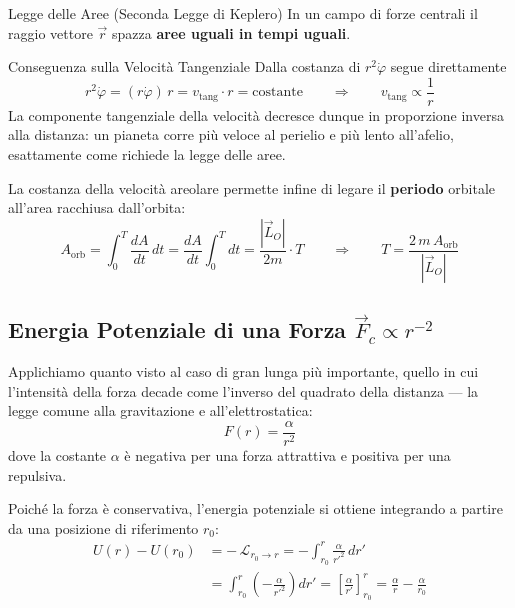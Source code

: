\begin{teorema}{Legge delle Aree (Seconda Legge di Keplero)}
In un campo di forze centrali il raggio vettore $\vec{r}$ spazza \textbf{aree uguali in tempi uguali}.
\end{teorema}

\begin{osservazione}{Conseguenza sulla Velocità Tangenziale}
Dalla costanza di $r^2\dot{\varphi}$ segue direttamente
\begin{equation}
    r^2 \dot{\varphi} = (r \dot{\varphi})\, r = v_{\text{tang}} \cdot r = \text{costante}
    \qquad \Longrightarrow \qquad
    v_{\text{tang}} \propto \frac{1}{r}
\end{equation}
La componente tangenziale della velocità decresce dunque in proporzione inversa alla distanza: un pianeta corre più veloce al perielio e più lento all'afelio, esattamente come richiede la legge delle aree.
\end{osservazione}

La costanza della velocità areolare permette infine di legare il \textbf{periodo} orbitale all'area racchiusa dall'orbita:
\begin{equation}
    A_{\text{orb}} = \int_0^T \frac{dA}{dt} \, dt
    = \frac{dA}{dt} \int_0^T dt
    = \frac{|\vec{L}_O|}{2m} \cdot T
    \qquad \Longrightarrow \qquad
    T = \frac{2 \, m \, A_{\text{orb}}}{|\vec{L}_O|}
\end{equation}

\subsection{Energia Potenziale di una Forza \texorpdfstring{$\vec{F}_c \propto r^{-2}$}{Fc proporzionale a r alla meno due}}

Applichiamo quanto visto al caso di gran lunga più importante, quello in cui l'intensità della forza decade come l'inverso del quadrato della distanza --- la legge comune alla gravitazione e all'elettrostatica:
\begin{equation}
    F(r) = \frac{\alpha}{r^2}
\end{equation}
dove la costante $\alpha$ è negativa per una forza attrattiva e positiva per una repulsiva.

Poiché la forza è conservativa, l'energia potenziale si ottiene integrando a partire da una posizione di riferimento $r_0$:
\begin{equation}
    \begin{split}
        U(r) - U(r_0) &= -\,\mathcal{L}_{r_0 \to r} = - \int_{r_0}^{r} \frac{\alpha}{r'^2} \, dr' \\
        &= \int_{r_0}^{r} \left(-\frac{\alpha}{r'^2}\right) dr'
        = \left[ \frac{\alpha}{r'} \right]_{r_0}^{r}
        = \frac{\alpha}{r} - \frac{\alpha}{r_0}
    \end{split}
\end{equation}

